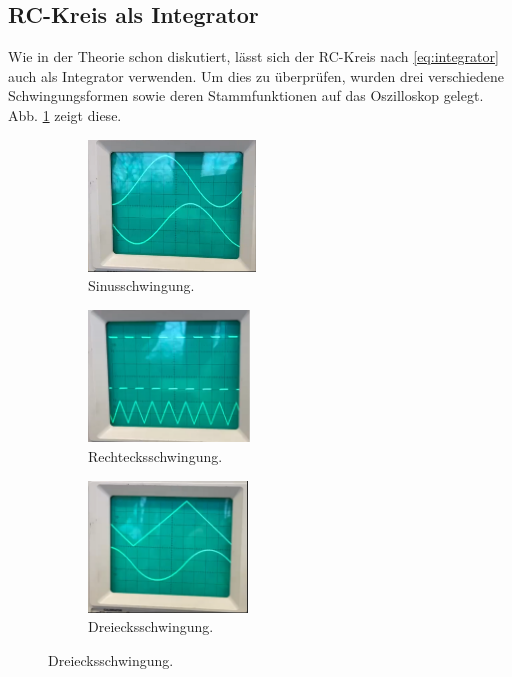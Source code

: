 \subsection{RC-Kreis als Integrator}
Wie in der Theorie schon diskutiert, lässt sich der RC-Kreis nach \autoref{eq:integrator} auch als Integrator verwenden. 
Um dies zu überprüfen, wurden drei verschiedene Schwingungsformen sowie deren Stammfunktionen auf das Oszilloskop gelegt.
Abb. \ref{fig:integration} zeigt diese.
\begin{figure}
    \begin{subfigure}{0.32\textwidth}
        \includegraphics[height=3.5cm]{messdaten/cos_int.png}
        \caption{Sinusschwingung.}
    \end{subfigure}
    \hfill
    \begin{subfigure}{0.32\textwidth}
        \includegraphics[height=3.5cm]{messdaten/dre_int.png}
        \caption{Rechtecksschwingung.}
    \end{subfigure}
    \hfill
    \begin{subfigure}{0.32\textwidth}
        \includegraphics[height=3.5cm]{messdaten/sin_int.png}
        \caption{Dreiecksschwingung.}
    \end{subfigure}  
    \label{fig:integration}
\end{figure}
